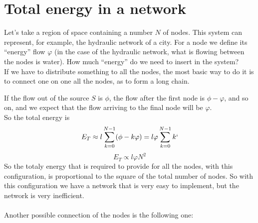 \chapter{Total energy in a network}
Let's take a region of space containing a number $N$ of nodes. This system can represent, for example, the hydraulic network of a city. 
For a node we define its ``energy'' flow $\varphi$ (in the case of the hydraulic network, what is flowing between the nodes is water). How much ``energy'' do we need to insert in the system? \\
If we have to distribute something to all the nodes, the most basic way to do it is to connect one on one all the nodes, as to form a long chain. \\
\begin{center}
\end{center}
If the flow out of the source $S$ is $\phi$, the flow after the first node is $\phi - \varphi$, and so on, and we expect that the flow arriving to the final node will be $\varphi$. \\
So the total energy is 
$$
	E_T \approx l\sum_{k=0}^{N-1} (\phi - k\varphi) = l\varphi\sum_{k=0}^{N-1} k`
$$
$$
	E_T \propto l\varphi N^2
$$
So the totaly energy that is required to provide for all the nodes, with this configuration, is proportional to the square of the total number of nodes. So with this configuration we have a network that is very easy to implement, but the network is very inefficient. \\ \\ 
Another possible connection of the nodes is the following one:
\begin{center}
\end{center}
